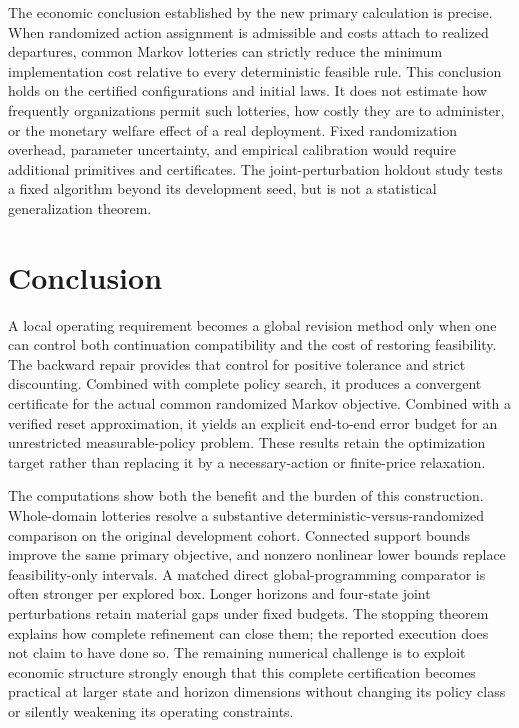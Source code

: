 The economic conclusion established by the new primary calculation is precise. When randomized action assignment is admissible and costs attach to realized departures, common Markov lotteries can strictly reduce the minimum implementation cost relative to every deterministic feasible rule. This conclusion holds on the certified configurations and initial laws. It does not estimate how frequently organizations permit such lotteries, how costly they are to administer, or the monetary welfare effect of a real deployment. Fixed randomization overhead, parameter uncertainty, and empirical calibration would require additional primitives and certificates. The joint-perturbation holdout study tests a fixed algorithm beyond its development seed, but is not a statistical generalization theorem.



\section{Conclusion}\label{sec:conclusion}
A local operating requirement becomes a global revision method only when one can control both continuation compatibility and the cost of restoring feasibility. The backward repair provides that control for positive tolerance and strict discounting. Combined with complete policy search, it produces a convergent certificate for the actual common randomized Markov objective. Combined with a verified reset approximation, it yields an explicit end-to-end error budget for an unrestricted measurable-policy problem. These results retain the optimization target rather than replacing it by a necessary-action or finite-price relaxation.

The computations show both the benefit and the burden of this construction. Whole-domain lotteries resolve a substantive deterministic-versus-randomized comparison on the original development cohort. Connected support bounds improve the same primary objective, and nonzero nonlinear lower bounds replace feasibility-only intervals. A matched direct global-programming comparator is often stronger per explored box. Longer horizons and four-state joint perturbations retain material gaps under fixed budgets. The stopping theorem explains how complete refinement can close them; the reported execution does not claim to have done so. The remaining numerical challenge is to exploit economic structure strongly enough that this complete certification becomes practical at larger state and horizon dimensions without changing its policy class or silently weakening its operating constraints.



